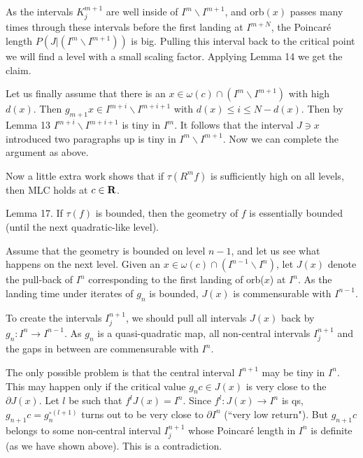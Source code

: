 As the intervals $K^{m+1}_j$ are well inside of 
  $I^{m}\backslash I^{m+1}$, and orb$(x)$ passes many times 
  through these intervals before the first landing
  at $I^{m+N}$, the Poincar\'{e} length \break
 $P(J|(I^m\backslash I^{m+1}))$ is big.
  Pulling this interval back
  to the critical point  we will find
  a level with a small scaling factor.   Applying Lemma 14 
  we get the claim. 

  Let us finally assume that there is an 
 $x\in \omega(c)\cap (I^m\backslash I^{m+1})$ with high $d(x)$. 
Then $g_{m+1}x\in I^{m+i}\backslash I^{m+i+1}$ with $d(x)\leq i\leq N-d(x)$.
Then by Lemma 13  $I^{m+i}\backslash I^{m+i+1}$ is tiny in $I^m$. It follows
 that the interval $J\ni x$ introduced two paragraphs up is tiny in
  $I^m\backslash I^{m+1}$. Now we can complete the argument as above. 
  \QED

\smallskip{} 
Now a little extra work shows that if 
$\tau(R^mf)$ is sufficiently high on all levels, then MLC
holds at $c\in {\bf R}$.




\proclaim Lemma 17. If $\tau(f)$ is bounded, then
the geometry of $f$ is essentially bounded
 (until the next quadratic-like level).

 Assume that the geometry is bounded on level $n-1$, and
let us see what happens on the next level. Given an 
$x\in \omega(c)\cap (I^{n-1}\backslash I^n)$, let $J(x)$ denote the
pull-back of $I^{n}$ corresponding to the first landing of orb($x$) at
$I^n$. As the landing time under iterates of $g_n$ is bounded,
$J(x)$ is commensurable with $I^{n-1}$. 

To create the intervals $I^{n+1}_j$, we should pull all intervals $J(x)$
back by $g_n: I^n\rightarrow I^{n-1}$. As $g_n$ is a quasi-quadratic map,
all non-central intervals $I^{n+1}_j$ and the gaps in between 
 are commensurable with $I^n$. 

The only possible problem is that the central interval $I^{n+1}$ may be
tiny in $I^n$. This may happen only if the critical value $g_n c\in J(x)$
is very close to the $\partial J(x)$. Let $l$ be such that 
$f^l J(x)=I^n$. Since $f^l: J(x)\rightarrow I^n$ is qs, 
$g_{n+1}c=g_n^{\circ (l+1)}$ turns out to be very close to $\partial I^n$
(``very low return"). But $g_{n+1}c$ belongs
to some non-central interval $I^{n+1}_j$ whose Poincar\'{e} length in
$I^n$ is definite (as we have shown above). This is a contradiction.

